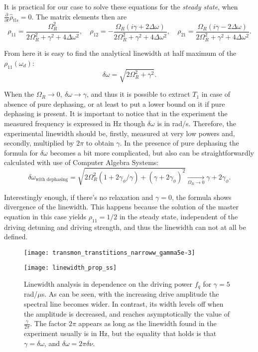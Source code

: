 It is practical for our case to solve these equations for the \textit{steady state}, when $\frac{\partial}{\partial t} \hat{\rho}_{tls} = 0$. The matrix elements then are
\[
ρ_{11} = \frac{Ω_{R}^{2}}{2 Ω_{R}^{2} + γ^{2} + 4 \Delta ω^{2}},\quad
ρ_{12} = - \frac{Ω_{R} \left(i γ + 2 \Delta ω\right)}{2 Ω_{R}^{2} + γ^{2} + 4 \Delta ω^{2}},\quad
ρ_{21} = \frac{Ω_{R} \left(i γ - 2 \Delta ω\right)}{2 Ω_{R}^{2} + γ^{2} + 4 \Delta ω^{2}}.
\]

From here it is easy to find the analytical linewidth at half maximum of the $\rho_{11}(\omega_d)$:
\[
\delta\omega = \sqrt{2\Omega_R^2+\gamma^2}.
\]

When the $\Omega_R \rightarrow 0,\ \delta\omega\rightarrow\gamma$, and thus it is possible to extract $T_1$ in case of absence of pure dephasing, or at least to put a lower bound on it if pure dephasing is present. It is important to notice that in the experiment the measured frequency is expressed in Hz though $\delta\omega$ is in rad/s. Therefore, the experimental linewidth should be, firstly, measured at very low powers and, secondly, multiplied by $2\pi$ to obtain $\gamma$. In the presence of pure dephasing the formula for $\delta\omega$ becomes a bit more complicated, but also can be straightforwardly calculated with use of Computer Algebra Systems:
\[
\delta\omega_{\text{with dephasing}} = \sqrt{2Ω_{R}^{2} (1+2 γ_{ϕ}/\gamma) + (\gamma +2\gamma_\phi)^2} \xrightarrow[\Omega_R\rightarrow 0]{} γ + 2γ_{ϕ}.
\]

Interestingly enough, if there's no relaxation and $\gamma = 0$, the formula shows divergence of the linewidth. This happens because the solution of the master equation in this case yields $\rho_{11} = 1/2$ in the steady state, independent of the driving detuning and driving strength, and thus the linewidth can not at all be defined.


\begin{figure}
\centering
\texttt{[image: transmon\_transtitions\_narroww\_gamma5e-3]}

\texttt{[image: linewidth\_prop\_ss]}
\caption{Linewidth analysis in dependence on the driving power $f_q$ for $\gamma = 5$ rad/$\mu$s. As can be seen, with the increasing drive amplitude the spectral line becomes wider. In contrast, its width levels off when the amplitude is decreased, and reaches asymptotically the value of $\frac{\gamma}{2\pi}$. The factor $2\pi$ appears as long as the linewidth found in the experiment usually is in Hz, but the equality that holds is that $\gamma = \delta\omega$, and $\delta\omega = 2\pi\delta\nu$.}
\label{fig:transmon_lw}
\end{figure}  
